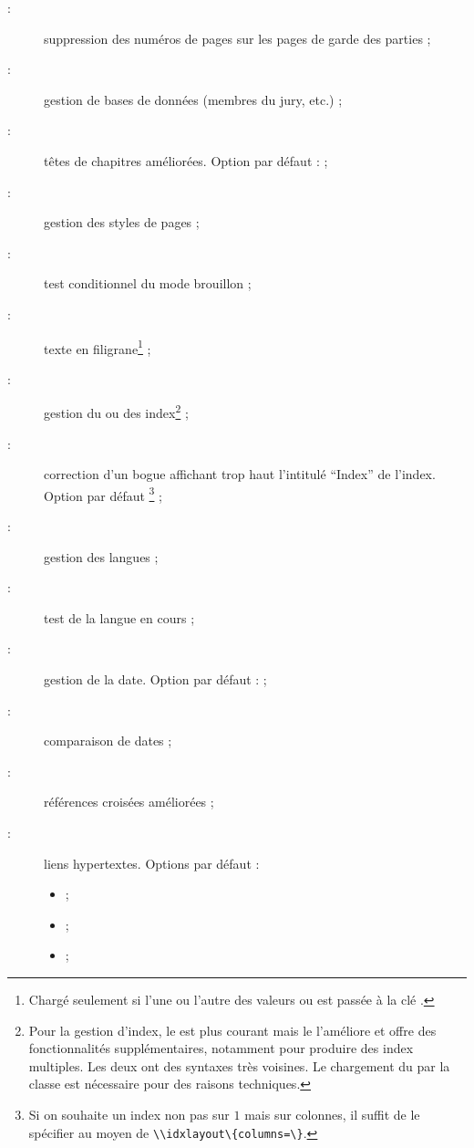 \begin{description}
\item[ :] suppression des numéros de pages sur
  les pages de garde des parties ;
\item[ :] gestion de bases de données (membres du
  jury, etc.) ;
\item[ :] têtes de chapitres améliorées. Option par défaut :
   ;
\item[ :] gestion des styles de pages ;
\item[ :] test conditionnel du mode brouillon ;
\item[ :] texte en filigrane\footnote{Chargé seulement
    si l'une ou l'autre des valeurs  ou 
    est passée à la clé .} ;
\item[ :] gestion du ou des index\footnote{Pour la gestion
    d'index, le  est plus courant mais le 
    l'améliore et offre des fonctionnalités supplémentaires, notamment pour
    produire des index multiples. Les deux ont des syntaxes très voisines. Le
    chargement du  par la classe est nécessaire pour des raisons
    techniques.} ;
\item[ :] correction d'un bogue affichant trop haut
  l'intitulé \enquote{Index} de l'index. Option par défaut
  \footnote{Si on souhaite un index non pas sur $1$ mais
    sur  colonnes, il suffit de le spécifier au moyen de
    \protect\lstinline+\\idxlayout\{columns=+\protect\lstinline+\}+.} ;
\item[ :] gestion des langues ;
\item[ :] test de la langue en cours ;
\item[ :] gestion de la date. Option par défaut :
   ;
\item[ :] comparaison de dates ;
\item[ :] références croisées améliorées ;
\item[ :] liens hypertextes. Options par défaut :
  \begin{itemize}
  \item {} ;
  \item {} ;
  \item {} ;

\end{itemize}
\end{description}

